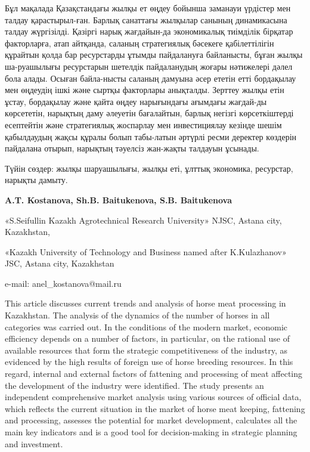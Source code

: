 Бұл мақалада Қазақстандағы жылқы ет өңдеу бойынша заманауи үрдістер мен
талдау қарастырыл-ған. Барлық санаттағы жылқылар санының динамикасына
талдау жүргізілді. Қазіргі нарық жағдайын-да экономикалық тиімділік
бірқатар факторларға, атап айтқанда, саланың стратегиялық бәсекеге
қабілеттілігін құрайтын қолда бар ресурстарды ұтымды пайдалануға
байланысты, бұған жылқы ша-руашылығы ресурстарын шетелдік пайдаланудың
жоғары нәтижелері дәлел бола алады. Осыған байла-нысты саланың дамуына
әсер ететін етті бордақылау мен өңдеудің ішкі және сыртқы факторлары
анықталды. Зерттеу жылқы етін ұстау, бордақылау және қайта өңдеу
нарығындағы ағымдағы жағдай-ды көрсететін, нарықтың даму әлеуетін
бағалайтын, барлық негізгі көрсеткіштерді есептейтін және стратегиялық
жоспарлау мен инвестициялау кезінде шешім қабылдаудың жақсы құралы болып
табы-латын әртүрлі ресми деректер көздерін пайдалана отырып, нарықтың
тәуелсіз жан-жақты талдауын ұсынады.

Түйін сөздер: жылқы шаруашылығы, жылқы еті, ұлттық экономика, ресурстар,
нарықты дамыту.

\begin{center}

{\bfseries A.T. Kostanova\envelope, Sh.B. Baitukenova, S.B.
Baitukenova}

«S.Seifullin Kazakh Agrotechnical Research University» NJSC, Astana city, Kazakhstan,

«Kazakh University of Technology and Business named after K.Kulazhanov» JSC, Astana city, Kazakhstan

e-mail: anel\_kostanova@mail.ru
\end{center}

This article discusses current trends and analysis of horse meat
processing in Kazakhstan. The analysis of the dynamics of the number of
horses in all categories was carried out. In the conditions of the
modern market, economic efficiency depends on a number of factors, in
particular, on the rational use of available resources that form the
strategic competitiveness of the industry, as evidenced by the high
results of foreign use of horse breeding resources. In this regard,
internal and external factors of fattening and processing of meat
affecting the development of the industry were identified. The study
presents an independent comprehensive market analysis using various
sources of official data, which reflects the current situation in the
market of horse meat keeping, fattening and processing, assesses the
potential for market development, calculates all the main key indicators
and is a good tool for decision-making in strategic planning and
investment.


